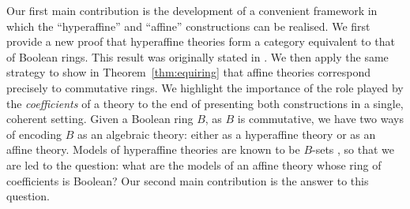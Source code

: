 \documentclass{amsart}
\numberwithin{equation}{section}
\theoremstyle{plain}
\theoremstyle{definition}
\begin{document}
Our first main contribution is the development of a convenient framework in which the ``hyperaffine'' and ``affine'' constructions can be realised.
We first 
provide a new proof that hyperaffine theories form a category equivalent to that of Boolean rings.
This result was originally stated in \cite[Theorem 4.9]{G24}.
We then apply the same strategy to show in Theorem~\ref{thm:equiring} that affine theories correspond precisely to commutative rings.
We highlight the importance of the role played by the \emph{coefficients} of a theory to the end of presenting both constructions in a single, coherent setting.
Given a Boolean ring $B$, as $B$ is commutative, we have two ways of encoding $B$ as an algebraic theory: either as a hyperaffine theory or as an affine theory. 
Models of hyperaffine theories are known to be $B$-sets \cite{B91}, so that we are led to the question: what are the models of an affine theory whose ring of coefficients is Boolean? 
Our second main contribution is the answer to this question.
\end{document}
